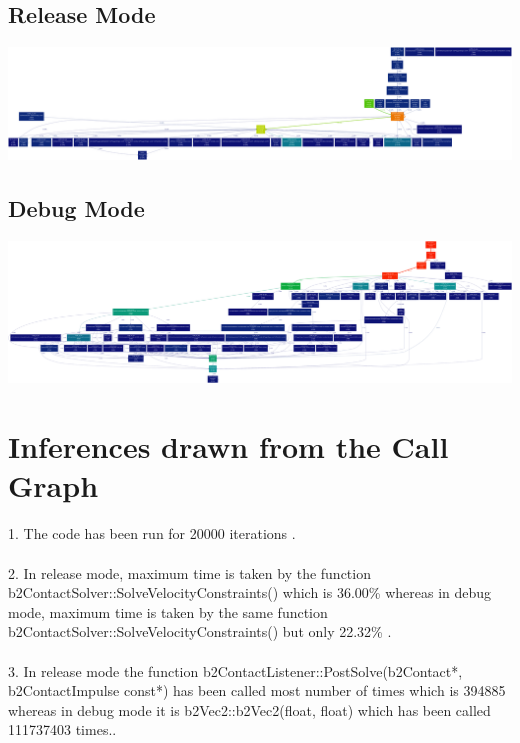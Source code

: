 \documentclass [11pt]{report}
\begin{document}
\subsection{Release Mode}
\begin{center}
\includegraphics [scale=0.10]{./images/release_output.png}
\end{center}

\subsection{Debug Mode}
\begin{center}
\includegraphics [scale=0.079]{./images/debug_output.png}
\end{center}

\section{Inferences drawn from the Call Graph}

1. The code has been run for 20000 iterations .\\ \\
2. In release mode, maximum time is taken by the function b2ContactSolver::SolveVelocityConstraints() which is 36.00\% whereas in debug mode, maximum time is taken by the same function\\ b2ContactSolver::SolveVelocityConstraints() but only 22.32\% .\\ \\
3. In release mode the function b2ContactListener::PostSolve(b2Contact*, b2ContactImpulse const*) has been called most number of times which is 394885 whereas in debug mode it is b2Vec2::b2Vec2(float, float) which has been called 111737403 times..\\ \\
\end{document}
